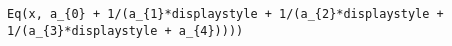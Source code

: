 \begin{verbatim}
Eq(x, a_{0} + 1/(a_{1}*displaystyle + 1/(a_{2}*displaystyle + 1/(a_{3}*displaystyle + a_{4}))))
\end{verbatim}
